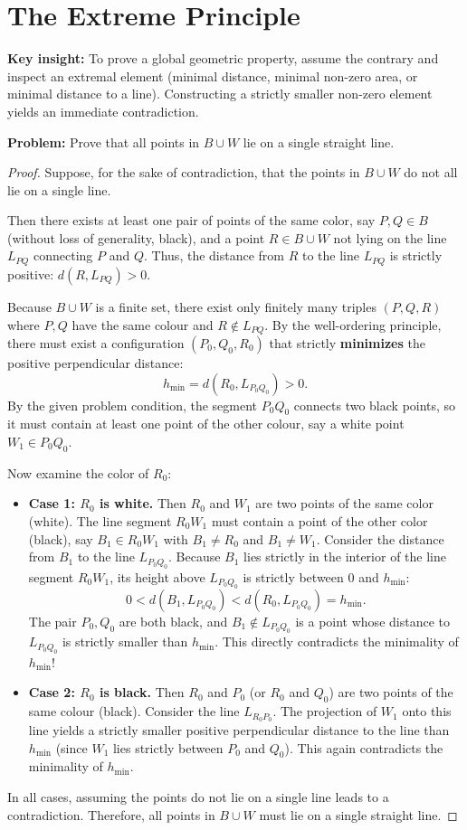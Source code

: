 \documentclass[12pt]{article}
\newcommand{\insight}[1]{\par\medskip\noindent\textbf{Key insight:} #1}
\begin{document}
\section{The Extreme Principle}

\insight{To prove a global geometric property, assume the contrary and inspect an extremal element (minimal distance, minimal non-zero area, or minimal distance to a line). Constructing a strictly smaller non-zero element yields an immediate contradiction.}

\textbf{Problem:} Prove that all points in $B \cup W$ lie on a single straight line.

\begin{proof}
Suppose, for the sake of contradiction, that the points in $B \cup W$ do not all lie on a single line.

Then there exists at least one pair of points of the same color, say $P, Q \in B$ (without loss of generality, black), and a point $R \in B \cup W$ not lying on the line $L_{PQ}$ connecting $P$ and $Q$.
Thus, the distance from $R$ to the line $L_{PQ}$ is strictly positive: $d(R, L_{PQ}) > 0$.

Because $B \cup W$ is a finite set, there exist only finitely many triples $(P, Q, R)$ where $P, Q$ have the same colour and $R \notin L_{PQ}$.
By the well-ordering principle, there must exist a configuration $(P_0, Q_0, R_0)$ that strictly \textbf{minimizes} the positive perpendicular distance:
\[
h_{\min} = d(R_0, L_{P_0 Q_0}) > 0.
\]
By the given problem condition, the segment $P_0 Q_0$ connects two black points, so it must contain at least one point of the other colour, say a white point $W_1 \in P_0 Q_0$.

Now examine the color of $R_0$:
\begin{itemize}
    \item \textbf{Case 1: $R_0$ is white.}
    Then $R_0$ and $W_1$ are two points of the same color (white). The line segment $R_0 W_1$ must contain a point of the other color (black), say $B_1 \in R_0 W_1$ with $B_1 \neq R_0$ and $B_1 \neq W_1$.
    Consider the distance from $B_1$ to the line $L_{P_0 Q_0}$. Because $B_1$ lies strictly in the interior of the line segment $R_0 W_1$, its height above $L_{P_0 Q_0}$ is strictly between $0$ and $h_{\min}$:
    \[
    0 < d(B_1, L_{P_0 Q_0}) < d(R_0, L_{P_0 Q_0}) = h_{\min}.
    \]
    The pair $P_0, Q_0$ are both black, and $B_1 \notin L_{P_0 Q_0}$ is a point whose distance to $L_{P_0 Q_0}$ is strictly smaller than $h_{\min}$. This directly contradicts the minimality of $h_{\min}$!

    \item \textbf{Case 2: $R_0$ is black.}
    Then $R_0$ and $P_0$ (or $R_0$ and $Q_0$) are two points of the same colour (black). Consider the line $L_{R_0 P_0}$. The projection of $W_1$ onto this line yields a strictly smaller positive perpendicular distance to the line than $h_{\min}$ (since $W_1$ lies strictly between $P_0$ and $Q_0$). This again contradicts the minimality of $h_{\min}$.
\end{itemize}
In all cases, assuming the points do not lie on a single line leads to a contradiction. Therefore, all points in $B \cup W$ must lie on a single straight line.
\end{proof}
\end{document}
